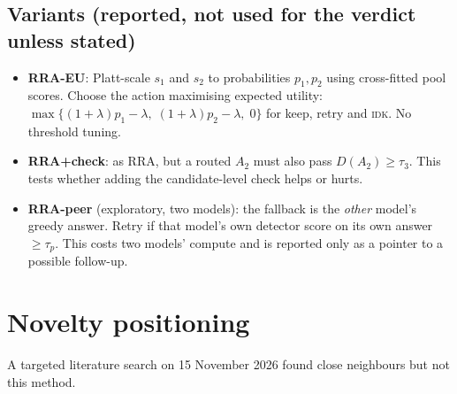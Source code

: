 \documentclass[11pt]{article}
\newcommand{\IDK}{\textsc{idk}}
\begin{document}
\subsection{Variants (reported, not used for the verdict unless stated)}\label{sec:variants}
\begin{itemize}
  \item \textbf{RRA-EU}: Platt-scale $s_1$ and $s_2$ to probabilities $p_1, p_2$ using cross-fitted pool scores.
        Choose the action maximising expected utility:
        $\max\{(1{+}\lambda)p_1 - \lambda,\; (1{+}\lambda)p_2 - \lambda,\; 0\}$ for keep, retry and \IDK.
        No threshold tuning.
  \item \textbf{RRA+check}: as RRA, but a routed $A_2$ must also pass $D(A_2) \ge \tau_3$. This tests whether
        adding the candidate-level check helps or hurts.
  \item \textbf{RRA-peer} (exploratory, two models): the fallback is the \emph{other} model's greedy answer.
        Retry if that model's own detector score on its own answer $\ge \tau_p$. This costs two models'
        compute and is reported only as a pointer to a possible follow-up.
\end{itemize}

\section{Novelty positioning}

A targeted literature search on 15 November 2026 found close neighbours but not this method.
\end{document}
